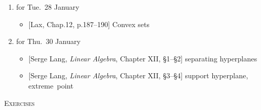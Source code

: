 \documentclass[11pt]{article}
\newcommand\0{\mathbf{0}}
\newcommand\<{\langle}
\renewcommand\>{\rangle}
\begin{document}
\begin{enumerate}[itemsep=-1ex]
\item%
for Tue.~28 January
  \begin{itemize}
  \item{}%
  [Lax, Chap.12, p.187--190] Convex sets
  \end{itemize}

\item%
for Thu.~30 January
  \begin{itemize}
  \item{}%
  [Serge Lang, \emph{Linear Algebra}, Chapter XII, \S1--\S2]
  separating hyperplanes
  \item{}%
  [Serge Lang, \emph{Linear Algebra}, Chapter XII, \S3--\S4]
  support hyperplane, extreme~point$\!\!$
  \end{itemize}
\end{enumerate}
  
\pagebreak

\noindent
\textsc{Exercises}%
\end{document}
